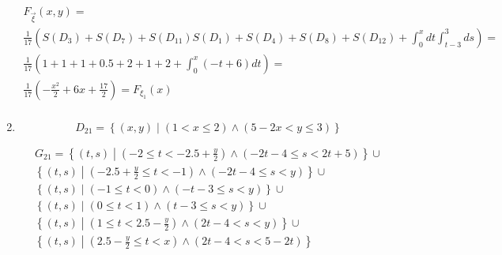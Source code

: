 \documentclass{article}
\begin{document}
\begin{enumerate}
\begin{center}
\begin{tikzpicture}
		\end{tikzpicture}
	\end{center}
	\[
	\begin{gathered}
		F_{\overrightarrow{\xi}} (x, y) = \\
		\frac{1}{17}\left(S(D_3) + S(D_7) + S(D_{11}) S(D_1) + S(D_4) + S(D_8) + S(D_{12}) + \int_{0}^{x} dt \int_{t-3}^{3} ds \right) = \\ \frac{1}{17}\left( 1 + 1 + 1 + 0.5 + 2 + 1 + 2 + \int_{0}^{x} (-t+6) dt\right) =\\ \frac{1}{17}(-\frac{x^2}{2} + 6x + \frac{17}{2}) = F_{\xi_1}(x)\\	
	\end{gathered}
	\] 
	\newpage
	\item
	\[
	D_{21} = \left\{ (x, y) \middle\vert (1 < x \leq 2) \wedge ( 5 - 2x < y \leq 3) \right\}
	\]
	
	\[
	\begin{gathered}
		G_{21} =  \left\{ (t, s) \middle\vert (-2 \leq t < -2.5 + \frac{y}{2}) \wedge ( -2t-4 \leq s < 2t+5) \right\} \cup \\ 
		\left\{ (t, s) \middle\vert ( -2.5 + \frac{y}{2} \leq t < -1) \wedge ( -2t-4 \leq s < y) \right\} \cup \\ \left\{ (t, s) \middle\vert ( -1 \leq t < 0) \wedge ( -t-3 \leq s < y) \right\} \cup \\ 
		\left\{ (t, s) \middle\vert ( 0 \leq t < 1) \wedge ( t-3 \leq s < y) \right\} \cup \\ 
		\left\{ (t, s) \middle\vert (1 \leq t < 2.5 - \frac{y}{2}) \wedge (2t - 4 < s < y) \right\}\cup \\
		\left\{ (t, s) \middle\vert (2.5 - \frac{y}{2} \leq t < x) \wedge (2t - 4 < s < 5-2t) \right\}
	\end{gathered}
	\]
	

\end{enumerate}
\end{document}
